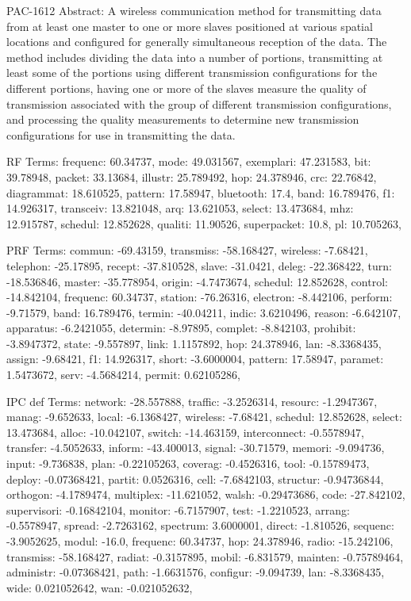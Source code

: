 PAC-1612
Abstract: A wireless communication method for transmitting data from at least one master to one or more slaves positioned at various spatial locations and configured for generally simultaneous reception of the data. The method includes dividing the data into a number of portions, transmitting at least some of the portions using different transmission configurations for the different portions, having one or more of the slaves measure the quality of transmission associated with the group of different transmission configurations, and processing the quality measurements to determine new transmission configurations for use in transmitting the data.

RF Terms: frequenc: 60.34737, mode: 49.031567, exemplari: 47.231583, bit: 39.78948, packet: 33.13684, illustr: 25.789492, hop: 24.378946, crc: 22.76842, diagrammat: 18.610525, pattern: 17.58947, bluetooth: 17.4, band: 16.789476, f1: 14.926317, transceiv: 13.821048, arq: 13.621053, select: 13.473684, mhz: 12.915787, schedul: 12.852628, qualiti: 11.90526, superpacket: 10.8, pl: 10.705263, 

PRF Terms: commun: -69.43159, transmiss: -58.168427, wireless: -7.68421, telephon: -25.17895, recept: -37.810528, slave: -31.0421, deleg: -22.368422, turn: -18.536846, master: -35.778954, origin: -4.7473674, schedul: 12.852628, control: -14.842104, frequenc: 60.34737, station: -76.26316, electron: -8.442106, perform: -9.71579, band: 16.789476, termin: -40.04211, indic: 3.6210496, reason: -6.642107, apparatus: -6.2421055, determin: -8.97895, complet: -8.842103, prohibit: -3.8947372, state: -9.557897, link: 1.1157892, hop: 24.378946, lan: -8.3368435, assign: -9.68421, f1: 14.926317, short: -3.6000004, pattern: 17.58947, paramet: 1.5473672, serv: -4.5684214, permit: 0.62105286, 

IPC def Terms: network: -28.557888, traffic: -3.2526314, resourc: -1.2947367, manag: -9.652633, local: -6.1368427, wireless: -7.68421, schedul: 12.852628, select: 13.473684, alloc: -10.042107, switch: -14.463159, interconnect: -0.5578947, transfer: -4.5052633, inform: -43.400013, signal: -30.71579, memori: -9.094736, input: -9.736838, plan: -0.22105263, coverag: -0.4526316, tool: -0.15789473, deploy: -0.07368421, partit: 0.0526316, cell: -7.6842103, structur: -0.94736844, orthogon: -4.1789474, multiplex: -11.621052, walsh: -0.29473686, code: -27.842102, supervisori: -0.16842104, monitor: -6.7157907, test: -1.2210523, arrang: -0.5578947, spread: -2.7263162, spectrum: 3.6000001, direct: -1.810526, sequenc: -3.9052625, modul: -16.0, frequenc: 60.34737, hop: 24.378946, radio: -15.242106, transmiss: -58.168427, radiat: -0.3157895, mobil: -6.831579, mainten: -0.75789464, administr: -0.07368421, path: -1.6631576, configur: -9.094739, lan: -8.3368435, wide: 0.021052642, wan: -0.021052632, 



